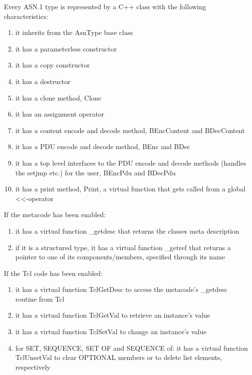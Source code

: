 Every ASN.1 type is represented by a C++ class with the following
characteristics:
\begin{enumerate}
  \item it inherits from the {\C AsnType} base class
  \item it has a parameterless constructor
  \item it has a copy constructor
  \item it has a destructor
  \item it has a clone method, {\C Clone}
  \item it has an assignment operator
  \item it has a content encode and decode method, {\C BEncContent} and {\C BDecContent}
  \item it has a PDU encode and decode method, {\C BEnc} and {\C BDec}
  \item it has a top level interfaces to the PDU encode and decode methods (handles the {\C setjmp} etc.) for the user, {\C BEncPdu} and {\C BDecPdu}
  \item it has a print method, {\C Print}, a virtual function that gets called from a global <\/<-operator
  \setcounter{saveenumi}{\value{enumi}}
\end{enumerate}
If the metacode has been enabled:
\begin{enumerate}
  \setcounter{enumi}{\value{saveenumi}}
  \item it has a virtual function {\C \_getdesc} that returns the classes meta description%
  \item if it is a structured type, it has a virtual function {\C \_getref} that returns a pointer to one of its components/members, specified through its name%
  \setcounter{saveenumi}{\value{enumi}}
\end{enumerate}
If the Tcl code has been enabled:
\begin{enumerate}
  \setcounter{enumi}{\value{saveenumi}}
  \item it has a virtual function {\C TclGetDesc} to access the metacode's {\C \_getdesc} routine from Tcl%
  \item it has a virtual function {\C TclGetVal} to retrieve an instance's value%
  \item it has a virtual function {\C TclSetVal} to change an instance's value%
  \item for SET, SEQUENCE, SET OF and SEQUENCE of: it has a virtual function {\C TclUnsetVal} to clear OPTIONAL members or to delete list elements, respectively%
\end{enumerate}

